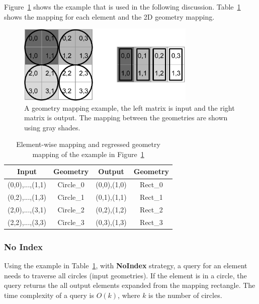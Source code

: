 \documentclass{sig-alternate}
\begin{document}
Figure~\ref{fig:example} shows the example that is used in the following discussion.
Table~\ref{tb:example} shows the mapping for each element and the 2D geometry mapping.
\begin{figure}[h]
\begin{center}
    \includegraphics[width=85mm]{pictures/example}
\caption {A geometry mapping example, the left matrix is input and the right matrix is output. The mapping between the geometries are shown using gray shades.
    \label{fig:example}
}
\end{center}
\end{figure}


\begin{table}[h]
\begin{center}
    \caption{Element-wise mapping and regressed geometry mapping of the example in Figure~\ref{fig:example}}
    \begin{scriptsize}
    \begin{tabular}{ | c | c | c | c |}
    \hline
    Input & Geometry & Output & Geometry \\ \hline \hline
    (0,0),...,(1,1) & Circle\_0 & (0,0),(1,0) & Rect\_0 \\ \hline
    (0,2),...,(1,3) & Circle\_1 & (0,1),(1,1) & Rect\_1 \\ \hline
    (2,0),...,(3,1) & Circle\_2 & (0,2),(1,2) & Rect\_2 \\ \hline
    (2,2),...,(3,3) & Circle\_3 & (0,3),(1,3) & Rect\_3 \\ \hline
    \end{tabular}
    \end{scriptsize}
    \label{tb:example}
\end{center}   
\end{table} 

\subsubsection{No Index}
Using the example in Table~\ref{tb:example}, with {\bf NoIndex} strategy, a query for an element needs to traverse all circles (input geometries).
If the element is in a circle, the query returns the all output elements expanded from the mapping rectangle.
The time complexity of a query is $O(k)$, where $k$ is the number of circles. 
\end{document}
